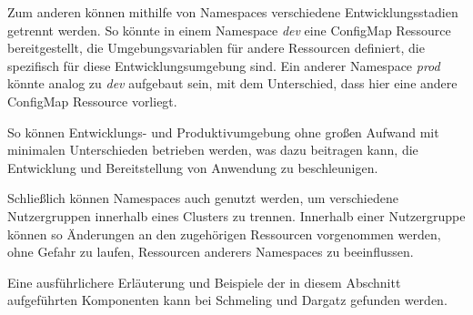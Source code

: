 \documentclass[11pt,a4paper]{article}
\begin{document}
Zum anderen können mithilfe von Namespaces verschiedene Entwicklungsstadien getrennt werden.
So könnte in einem Namespace \emph{dev} eine ConfigMap Ressource bereitgestellt,
die Umgebungsvariablen für andere Ressourcen definiert, die spezifisch für diese 
Entwicklungsumgebung sind. Ein anderer Namespace \emph{prod} könnte analog zu \emph{dev}
aufgebaut sein, mit dem Unterschied, dass hier eine andere ConfigMap Ressource vorliegt.

So können Entwicklungs- und Produktivumgebung ohne großen Aufwand mit minimalen Unterschieden betrieben
werden, was dazu beitragen kann, die Entwicklung und Bereitstellung von Anwendung zu beschleunigen.

Schließlich können Namespaces auch genutzt werden, um verschiedene Nutzergruppen innerhalb eines Clusters 
zu trennen. Innerhalb einer Nutzergruppe können so Änderungen an den zugehörigen Ressourcen vorgenommen werden,
ohne Gefahr zu laufen, Ressourcen anderers Namespaces zu beeinflussen.


Eine ausführlichere Erläuterung und Beispiele der in diesem Abschnitt aufgeführten Komponenten 
kann bei Schmeling und Dargatz \cite{Schmeling_Dargatz_2022} gefunden werden.



\end{document}
